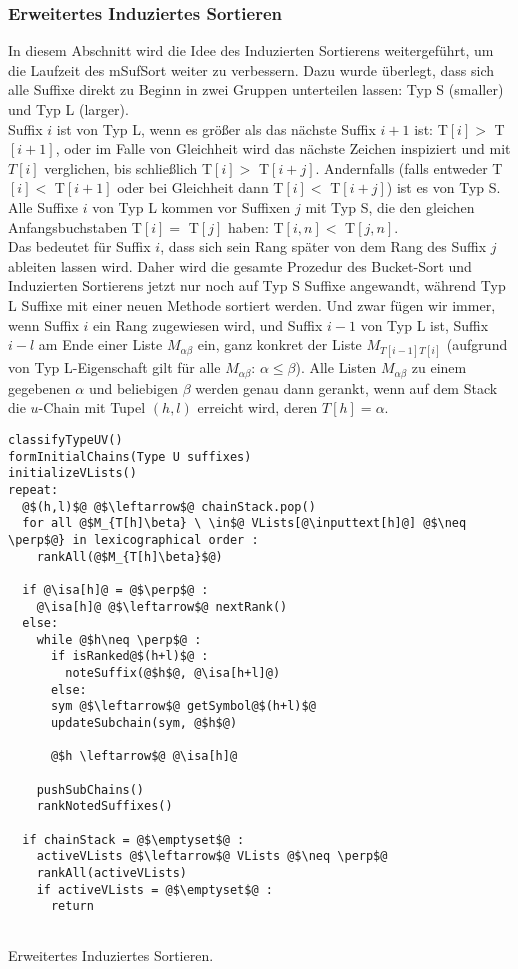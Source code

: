 \subsubsection{Erweitertes Induziertes Sortieren} 
\label{erwIndSort}

In diesem Abschnitt wird die Idee des Induzierten Sortierens weitergeführt, um die Laufzeit des mSufSort weiter zu verbessern.
Dazu wurde überlegt, dass sich alle Suffixe direkt zu Beginn in zwei Gruppen unterteilen lassen: Typ S (smaller) und Typ L (larger).\\
Suffix $i$ ist von Typ L, wenn es größer als das nächste Suffix $i+1$ ist: T$[i] >$ T$[i+1]$, oder im Falle von Gleichheit wird das nächste Zeichen inspiziert und mit $T[i]$ verglichen, bis schließlich T$[i] >$ T$[i+j]$. Andernfalls (falls entweder T$[i] <$ T$[i+1]$ oder bei Gleichheit dann T$[i] <$ T$[i+j]$) ist es von Typ S. Alle Suffixe $i$ von Typ L kommen vor Suffixen $j$ mit Typ S, die den gleichen Anfangsbuchstaben T$[i] =$ T$[j]$ haben: T$[i,n] <$ T$[j,n]$.
\\
Das bedeutet für Suffix $i$, dass sich sein Rang später von dem Rang des Suffix $j$ ableiten lassen wird. Daher wird die gesamte Prozedur des Bucket-Sort und Induzierten Sortierens jetzt nur noch auf Typ S Suffixe angewandt, während Typ L Suffixe mit einer neuen Methode sortiert werden.
Und zwar fügen wir immer, wenn Suffix $i$ ein Rang zugewiesen wird, und Suffix $i-1$ von Typ L ist, Suffix $i-l$ am Ende einer Liste $M_{\alpha\beta}$ ein, ganz konkret der  Liste $M_{T[i-1]T[i]}$ (aufgrund von Typ L-Eigenschaft gilt für alle $M_{\alpha\beta}$: $\alpha \leq \beta$). 
Alle Listen $M_{\alpha\beta}$ zu einem gegebenen $\alpha$ und beliebigen $\beta$ werden genau dann gerankt, wenn auf dem Stack die $u$-Chain mit Tupel $(h, l)$ erreicht wird, deren $T[h] = \alpha$.


\begin{listing}[htp]
\begin{verbatim}
classifyTypeUV()
formInitialChains(Type U suffixes)
initializeVLists()
repeat:
  @$(h,l)$@ @$\leftarrow$@ chainStack.pop()	
  for all @$M_{T[h]\beta} \ \in$@ VLists[@\inputtext[h]@] @$\neq \perp$@} in lexicographical order :
    rankAll(@$M_{T[h]\beta}$@)
  
  if @\isa[h]@ = @$\perp$@ :
    @\isa[h]@ @$\leftarrow$@ nextRank()		
  else:
    while @$h\neq \perp$@ :
      if isRanked@$(h+l)$@ :
        noteSuffix(@$h$@, @\isa[h+l]@)
      else:
      sym @$\leftarrow$@ getSymbol@$(h+l)$@
      updateSubchain(sym, @$h$@)
      
      @$h \leftarrow$@ @\isa[h]@
	
    pushSubChains()	
    rankNotedSuffixes()
  
  if chainStack = @$\emptyset$@ :
    activeVLists @$\leftarrow$@ VLists @$\neq \perp$@
    rankAll(activeVLists)
    if activeVLists = @$\emptyset$@ :
      return
  		
\end{verbatim}
\caption{Erweitertes Induziertes Sortieren.}
\label{erwIndSort}
\end{listing}

